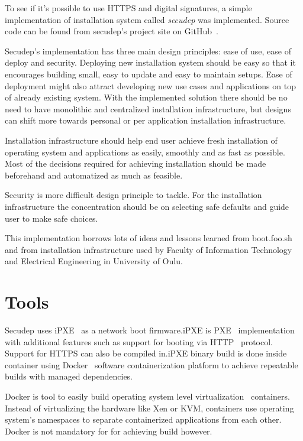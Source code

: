 
To see if it's possible to use HTTPS and digital signatures, a simple
implementation of installation system called \emph{secudep} was
implemented. Source code can be found from secudep's project site on
GitHub~\cite{secudep}.

Secudep's implementation has three main design principles: ease of
use, ease of deploy and security. Deploying new installation system
should be easy so that it encourages building small, easy to update
and easy to maintain setups. Ease of deployment might also attract
developing new use cases and applications on top of already existing
system. With the implemented solution there should be no need to have
monolithic and centralized installation infrastructure, but designs
can shift more towards personal or per application installation
infrastructure.

Installation infrastructure should help end user achieve fresh
installation of operating system and applications as easily, smoothly
and as fast as possible. Most of the decisions required for achieving
installation should be made beforehand and automatized as much as
feasible.

Security is more difficult design principle to tackle. For the
installation infrastructure the concentration should be on selecting
safe defaults and guide user to make safe choices.

This implementation borrows lots of ideas and lessons learned from
boot.foo.sh\cite{boot-foo-sh} and from installation infrastructure
used by Faculty of Information Technology and Electrical Engineering
in University of Oulu.

\section{Tools}

Secudep uses iPXE~\cite{iPXE} as a network boot firmware.\@ iPXE is
PXE~\cite{PXEspec} implementation with additional features such as
support for booting via HTTP~\cite{RFC2616} protocol. Support for
HTTPS can also be compiled in.\@ iPXE binary build is done inside
container using Docker~\cite{Docker} software containerization
platform to achieve repeatable builds with managed dependencies.

Docker is tool to easily build operating system level
virtualization~\cite{Soltesz2007} containers. Instead of virtualizing
the hardware like Xen or KVM, containers use operating system's
namespaces to separate containerized applications from each
other. Docker is not mandatory for for achieving build however.

